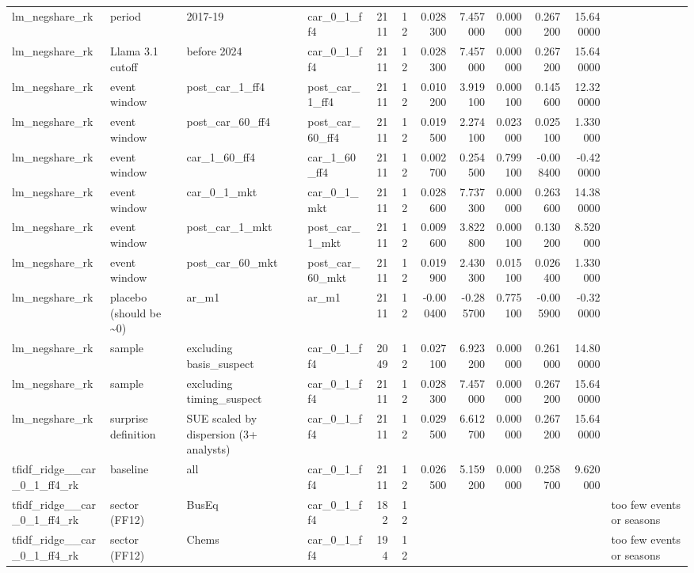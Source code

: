 \begin{table}
\begin{tabular}{llllrrrrrrrl}
lm\_negshare\_rk & period & 2017-19 & car\_0\_1\_ff4 & 2111 & 12 & 0.028300 & 7.457000 & 0.000000 & 0.267200 & 15.640000 &  \\
lm\_negshare\_rk & Llama 3.1 cutoff & before 2024 & car\_0\_1\_ff4 & 2111 & 12 & 0.028300 & 7.457000 & 0.000000 & 0.267200 & 15.640000 &  \\
lm\_negshare\_rk & event window & post\_car\_1\_ff4 & post\_car\_1\_ff4 & 2111 & 12 & 0.010200 & 3.919100 & 0.000100 & 0.145600 & 12.320000 &  \\
lm\_negshare\_rk & event window & post\_car\_60\_ff4 & post\_car\_60\_ff4 & 2111 & 12 & 0.019500 & 2.274100 & 0.023000 & 0.025100 & 1.330000 &  \\
lm\_negshare\_rk & event window & car\_1\_60\_ff4 & car\_1\_60\_ff4 & 2111 & 12 & 0.002700 & 0.254500 & 0.799100 & -0.008400 & -0.420000 &  \\
lm\_negshare\_rk & event window & car\_0\_1\_mkt & car\_0\_1\_mkt & 2111 & 12 & 0.028600 & 7.737300 & 0.000000 & 0.263600 & 14.380000 &  \\
lm\_negshare\_rk & event window & post\_car\_1\_mkt & post\_car\_1\_mkt & 2111 & 12 & 0.009600 & 3.822800 & 0.000100 & 0.130200 & 8.520000 &  \\
lm\_negshare\_rk & event window & post\_car\_60\_mkt & post\_car\_60\_mkt & 2111 & 12 & 0.019900 & 2.430300 & 0.015100 & 0.026400 & 1.330000 &  \\
lm\_negshare\_rk & placebo (should be \textasciitilde 0) & ar\_m1 & ar\_m1 & 2111 & 12 & -0.000400 & -0.285700 & 0.775100 & -0.005900 & -0.320000 &  \\
lm\_negshare\_rk & sample & excluding basis\_suspect & car\_0\_1\_ff4 & 2049 & 12 & 0.027100 & 6.923200 & 0.000000 & 0.261000 & 14.800000 &  \\
lm\_negshare\_rk & sample & excluding timing\_suspect & car\_0\_1\_ff4 & 2111 & 12 & 0.028300 & 7.457000 & 0.000000 & 0.267200 & 15.640000 &  \\
lm\_negshare\_rk & surprise definition & SUE scaled by dispersion (3+ analysts) & car\_0\_1\_ff4 & 2111 & 12 & 0.029500 & 6.612700 & 0.000000 & 0.267200 & 15.640000 &  \\
tfidf\_ridge\_\_car\_0\_1\_ff4\_rk & baseline & all & car\_0\_1\_ff4 & 2111 & 12 & 0.026500 & 5.159200 & 0.000000 & 0.258700 & 9.620000 &  \\
tfidf\_ridge\_\_car\_0\_1\_ff4\_rk & sector (FF12) & BusEq & car\_0\_1\_ff4 & 182 & 12 &  &  &  &  &  & too few events or seasons \\
tfidf\_ridge\_\_car\_0\_1\_ff4\_rk & sector (FF12) & Chems & car\_0\_1\_ff4 & 194 & 12 &  &  &  &  &  & too few events or seasons \\

\end{tabular}
\end{table}
